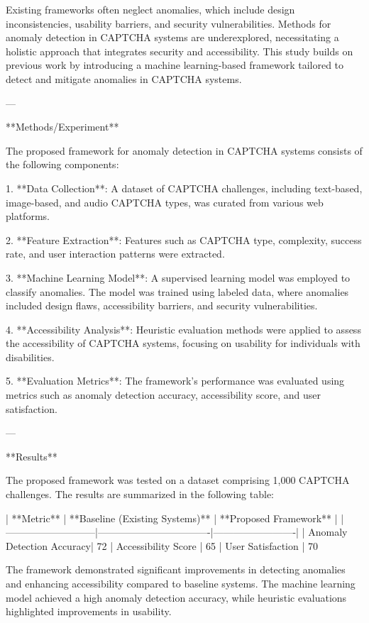 Existing frameworks often neglect anomalies, which include design inconsistencies, usability barriers, and security vulnerabilities. Methods for anomaly detection in CAPTCHA systems are underexplored, necessitating a holistic approach that integrates security and accessibility. This study builds on previous work by introducing a machine learning-based framework tailored to detect and mitigate anomalies in CAPTCHA systems.

---

**Methods/Experiment**

The proposed framework for anomaly detection in CAPTCHA systems consists of the following components:

1. **Data Collection**: A dataset of CAPTCHA challenges, including text-based, image-based, and audio CAPTCHA types, was curated from various web platforms.

2. **Feature Extraction**: Features such as CAPTCHA type, complexity, success rate, and user interaction patterns were extracted.

3. **Machine Learning Model**: A supervised learning model was employed to classify anomalies. The model was trained using labeled data, where anomalies included design flaws, accessibility barriers, and security vulnerabilities.

4. **Accessibility Analysis**: Heuristic evaluation methods were applied to assess the accessibility of CAPTCHA systems, focusing on usability for individuals with disabilities.

5. **Evaluation Metrics**: The framework's performance was evaluated using metrics such as anomaly detection accuracy, accessibility score, and user satisfaction.

---

**Results**

The proposed framework was tested on a dataset comprising 1,000 CAPTCHA challenges. The results are summarized in the following table:

| **Metric**                | **Baseline (Existing Systems)** | **Proposed Framework** |
|---------------------------|----------------------------------|-------------------------|
| Anomaly Detection Accuracy| 72%
| Accessibility Score       | 65%
| User Satisfaction         | 70%

The framework demonstrated significant improvements in detecting anomalies and enhancing accessibility compared to baseline systems. The machine learning model achieved a high anomaly detection accuracy, while heuristic evaluations highlighted improvements in usability.


